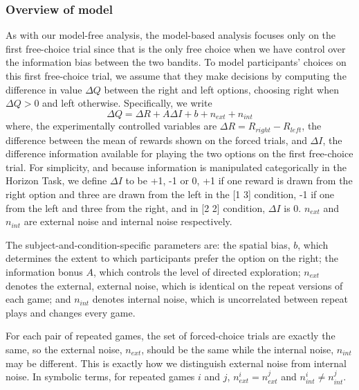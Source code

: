 \documentclass[12pt]{article}
\begin{document}
	\subsubsection*{Overview of model}
	As with our model-free analysis, the model-based analysis focuses only on the first free-choice trial since that is the only free choice when we have control over the information bias between the two bandits. To model participants' choices on this first free-choice trial, we assume that they make decisions by computing the difference in value $\Delta Q$ between the right and left options, choosing right when $\Delta Q > 0$ and left otherwise.  Specifically, we write
	\begin{equation}
	\Delta Q= \Delta R+A \Delta    I+b+n_{ext}+n_{int}
	\end{equation}
	where, the experimentally controlled variables are $\Delta R=R_{right}-R_{left}$, the difference between the mean of rewards shown on the forced trials, and $\Delta I$, the difference information available for playing the two options on the first free-choice trial. For simplicity, and because information is manipulated categorically in the Horizon Task, we define $\Delta I$ to be +1, -1 or 0, +1 if one reward is drawn from the right option and three are drawn from the left in the [1 3] condition, -1 if one from the left and three from the right, and in [2 2] condition, $\Delta I$ is 0. $n_{ext}$ and $n_{int}$ are external noise and internal noise respectively.
	
	The subject-and-condition-specific parameters are: the spatial bias, $b$, which determines the extent to which participants prefer the option on the right; the information bonus $A$, which controls the level of directed exploration; $n_{ext}$ denotes the external, external noise, which is identical on the repeat versions of each game; and $n_{int}$ denotes internal noise, which is uncorrelated between repeat plays and changes every game.
	
	For each pair of repeated games, the set of forced-choice trials are exactly the same, so the external noise, $n_{ext}$, should be the same while the internal noise, $n_{int}$ may be different. This is exactly how we distinguish external noise from internal noise. In symbolic terms, for repeated games $i$ and $j$,  $n_{ext}^i=n_{ext}^j$  and $n_{int}^i \neq n_{int}^j$.
	
	
\end{document}
